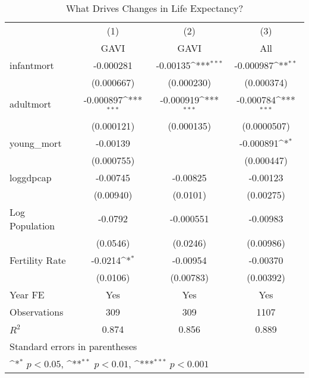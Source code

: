 \begin{table}[htbp]\centering
\def\sym#1{\ifmmode^{#1}\else\(^{#1}\)\fi}
\caption{What Drives Changes in Life Expectancy?}
\begin{tabular}{l*{3}{c}}
\toprule
                &\multicolumn{1}{c}{(1)}&\multicolumn{1}{c}{(2)}&\multicolumn{1}{c}{(3)}\\
                &\multicolumn{1}{c}{GAVI}&\multicolumn{1}{c}{GAVI}&\multicolumn{1}{c}{All}\\
\midrule
infantmort      &-0.000281         & -0.00135\sym{***}&-0.000987\sym{**} \\
                &(0.000667)         &(0.000230)         &(0.000374)         \\
\addlinespace
adultmort       &-0.000897\sym{***}&-0.000919\sym{***}&-0.000784\sym{***}\\
                &(0.000121)         &(0.000135)         &(0.0000507)         \\
\addlinespace
young\_mort      & -0.00139         &                  &-0.000891\sym{*}  \\
                &(0.000755)         &                  &(0.000447)         \\
\addlinespace
loggdpcap       & -0.00745         & -0.00825         & -0.00123         \\
                &(0.00940)         & (0.0101)         &(0.00275)         \\
\addlinespace
Log Population  &  -0.0792         &-0.000551         & -0.00983         \\
                & (0.0546)         & (0.0246)         &(0.00986)         \\
\addlinespace
Fertility Rate  &  -0.0214\sym{*}  & -0.00954         & -0.00370         \\
                & (0.0106)         &(0.00783)         &(0.00392)         \\
\addlinespace
Year FE         &      Yes         &      Yes         &      Yes         \\
\midrule
Observations    &      309         &      309         &     1107         \\
\(R^{2}\)       &    0.874         &    0.856         &    0.889         \\
\bottomrule
\multicolumn{4}{l}{\footnotesize Standard errors in parentheses}\\
\multicolumn{4}{l}{\footnotesize \sym{*} \(p<0.05\), \sym{**} \(p<0.01\), \sym{***} \(p<0.001\)}\\
\end{tabular}
\end{table}
